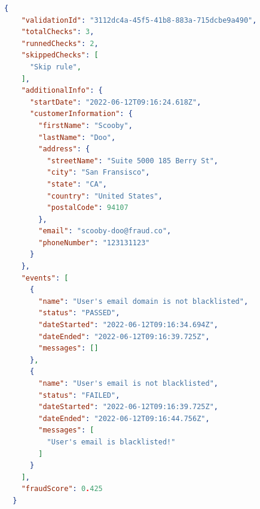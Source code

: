 \begin{lstlisting}[caption={Validation result example (JSON)}, language=json]
  {
    "validationId": "3112dc4a-45f5-41b8-883a-715dcbe9a490",
    "totalChecks": 3,
    "runnedChecks": 2,
    "skippedChecks": [
      "Skip rule",
    ],
    "additionalInfo": {
      "startDate": "2022-06-12T09:16:24.618Z",
      "customerInformation": {
        "firstName": "Scooby",
        "lastName": "Doo",
        "address": {
          "streetName": "Suite 5000 185 Berry St",
          "city": "San Fransisco",
          "state": "CA",
          "country": "United States",
          "postalCode": 94107
        },
        "email": "scooby-doo@fraud.co",
        "phoneNumber": "123131123"
      }
    },
    "events": [
      {
        "name": "User's email domain is not blacklisted",
        "status": "PASSED",
        "dateStarted": "2022-06-12T09:16:34.694Z",
        "dateEnded": "2022-06-12T09:16:39.725Z",
        "messages": []
      },
      {
        "name": "User's email is not blacklisted",
        "status": "FAILED",
        "dateStarted": "2022-06-12T09:16:39.725Z",
        "dateEnded": "2022-06-12T09:16:44.756Z",
        "messages": [
          "User's email is blacklisted!"
        ]
      }
    ],
    "fraudScore": 0.425  
  }
\end{lstlisting}
